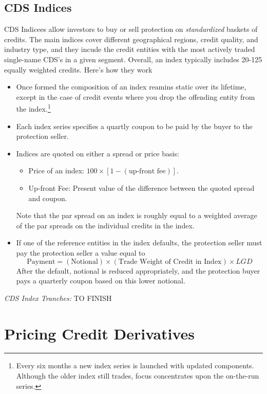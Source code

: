 \documentclass[a4paper,12pt]{scrartcl}
\begin{document}
\newpage
\subsection{CDS Indices} 

CDS Indicees allow investors to buy or sell protection on 
\emph{standardized} baskets of credits.  The main indices
cover different geographical regions, credit quality, and industry
type, and they incude the credit entities
with the most actively traded single-name CDS's in a given segment.
Overall, an index typically includes 20-125 equally weighted credits.
Here's how they work
\begin{itemize}
   \item Once formed the composition of an index reamins static over
      its lifetime, except in the case of credit events where you drop
      the offending entity from the index.\footnote{Every six months a 
      new index series is launched with updated
      components. Although the older index still trades, focus
      concentrates upon the on-the-run series.}
   \item Each index series specifies a quartly coupon to be paid
      by the buyer to the protection seller.
   \item Indices are quoted on either a spread or price
      basis: 
      \begin{itemize} 
	 \item Price of an index: $100\times[1-(\text{up-front fee})]$. 
	 \item Up-front Fee: Present value of the difference between
	    the quoted spread and coupon.
      \end{itemize}
      Note that the par spread on an index is roughly equal to 
      a weighted average of the par spreads on the individual
      credits in the index.
   \item If one of the reference entities in the index defaults, the
      protection seller must pay the protection seller a value equal to 
      \[ \text{Payment} = (\text{Notional}) \times 
	 (\text{Trade Weight of Credit in Index}) \times LGD \]
      After the default, notional is reduced appropriately, and the
      protection buyer pays a quarterly coupon based on this lower
      notional.
\end{itemize}
{\sl CDS Index Tranches:}  TO FINISH

\newpage
\section{Pricing Credit Derivatives}
\end{document}
